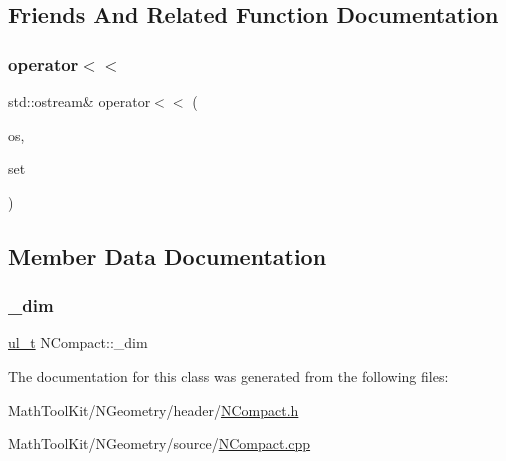 \subsection{Friends And Related Function Documentation}
\mbox{\label{class_n_compact_a2afd0750c38a42e4afdc675fb8ac0221}} 
\subsubsection{\texorpdfstring{operator$<$$<$}{operator<<}}
{\footnotesize\ttfamily std\+::ostream\& operator$<$$<$ (\begin{DoxyParamCaption}\item[{std\+::ostream \&}]{os,  }\item[{const \mbox{\hyperlink{class_n_compact}{N\+Compact}} \&}]{set }\end{DoxyParamCaption})\hspace{0.3cm}{\ttfamily [friend]}}



\subsection{Member Data Documentation}
\mbox{\label{class_n_compact_a0f13086af28c4e2dbbcaa308f28ed506}} 
\subsubsection{\texorpdfstring{\_dim}{\_dim}}
{\footnotesize\ttfamily \mbox{\hyperlink{typedef_8h_a1b140a2034db3f5dfe18a987745df43a}{ul\+\_\+t}} N\+Compact\+::\+\_\+dim\hspace{0.3cm}{\ttfamily [protected]}}



The documentation for this class was generated from the following files\+:\begin{DoxyCompactItemize}
\item 
Math\+Tool\+Kit/\+N\+Geometry/header/\mbox{\hyperlink{_n_compact_8h}{N\+Compact.\+h}}\item 
Math\+Tool\+Kit/\+N\+Geometry/source/\mbox{\hyperlink{_n_compact_8cpp}{N\+Compact.\+cpp}}\end{DoxyCompactItemize}
